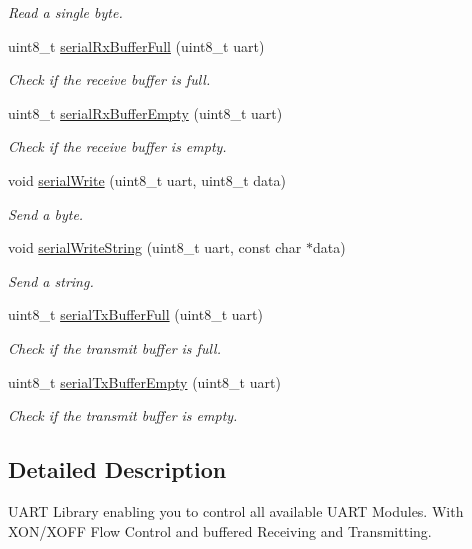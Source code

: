 \begin{DoxyCompactItemize}
\begin{DoxyCompactList}\small\item\em Read a single byte. \end{DoxyCompactList}\item 
uint8\-\_\-t \hyperlink{group__uart_ga73d16b244172336e7306ea2e4cf90fa1}{serial\-Rx\-Buffer\-Full} (uint8\-\_\-t uart)
\begin{DoxyCompactList}\small\item\em Check if the receive buffer is full. \end{DoxyCompactList}\item 
uint8\-\_\-t \hyperlink{group__uart_ga742268372398b85935564fded999b198}{serial\-Rx\-Buffer\-Empty} (uint8\-\_\-t uart)
\begin{DoxyCompactList}\small\item\em Check if the receive buffer is empty. \end{DoxyCompactList}\item 
void \hyperlink{group__uart_ga388583adaa7db4fad121b6454668b347}{serial\-Write} (uint8\-\_\-t uart, uint8\-\_\-t data)
\begin{DoxyCompactList}\small\item\em Send a byte. \end{DoxyCompactList}\item 
void \hyperlink{group__uart_ga054d68834f9ca19f3b2cf9d714337de4}{serial\-Write\-String} (uint8\-\_\-t uart, const char $\ast$data)
\begin{DoxyCompactList}\small\item\em Send a string. \end{DoxyCompactList}\item 
uint8\-\_\-t \hyperlink{group__uart_ga8a6adfd3c350ceb55605d003a62a36a4}{serial\-Tx\-Buffer\-Full} (uint8\-\_\-t uart)
\begin{DoxyCompactList}\small\item\em Check if the transmit buffer is full. \end{DoxyCompactList}\item 
uint8\-\_\-t \hyperlink{group__uart_ga14c345ea0707111e988a80ef1da65e32}{serial\-Tx\-Buffer\-Empty} (uint8\-\_\-t uart)
\begin{DoxyCompactList}\small\item\em Check if the transmit buffer is empty. \end{DoxyCompactList}\end{DoxyCompactItemize}


\subsection{Detailed Description}
U\-A\-R\-T Library enabling you to control all available U\-A\-R\-T Modules. With X\-O\-N/\-X\-O\-F\-F Flow Control and buffered Receiving and Transmitting. 

